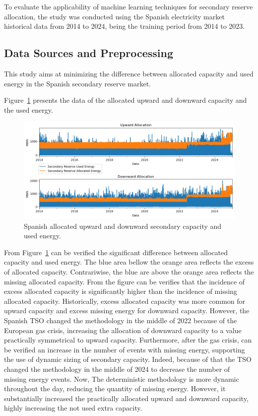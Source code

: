 To evaluate the applicability of machine learning techniques for secondary reserve allocation, the study was conducted using the Spanish electricity market historical data from 2014 to 2024, being the training period from 2014 to 2023.

\subsection{Data Sources and Preprocessing}

{
This study aims at minimizing the difference between allocated capacity and used energy in the Spanish secondary reserve market}.\par
{Figure~\ref{fig:training_data} presents the data of the allocated upward and downward capacity and the used energy.}

\begin{figure}[H]
    \centering
    \includegraphics[width=\textwidth]{plots/allocations_dataset.png}
    \caption{Spanish allocated upward and downward secondary capacity and used energy.}
    \label{fig:training_data}
  \end{figure}
	
	{
	From Figure~\ref{fig:training_data} can be verified the significant difference between allocated capacity and used energy.
	The blue area bellow the orange area reflects the excess of allocated capacity. Contrariwise, the blue are above the orange area reflects the missing allocated capacity.
	From the figure can be verifies that the incidence of excess allocated capacity is significantly higher than the incidence of missing allocated capacity.
	Historically, excess allocated capacity was more common for upward capacity and excess missing energy for downward capacity.
	However, the Spanish TSO changed the methodology in the middle of 2022 because of the European gas crisis, increasing the allocation of downward capacity to a value practically symmetrical to upward capacity.
	Furthermore, after the gas crisis, can be verified an increase in the number of events with missing energy, supporting the use of dynamic sizing of secondary capacity.
	Indeed, because of that the TSO changed the methodology in the middle of 2024 to decrease the number of missing energy events. Now, The deterministic methodology is more dynamic throughout the day, reducing the quantity of missing energy. However, it substantially increased the practically allocated upward and downward capacity, highly increasing the not used extra capacity.}

